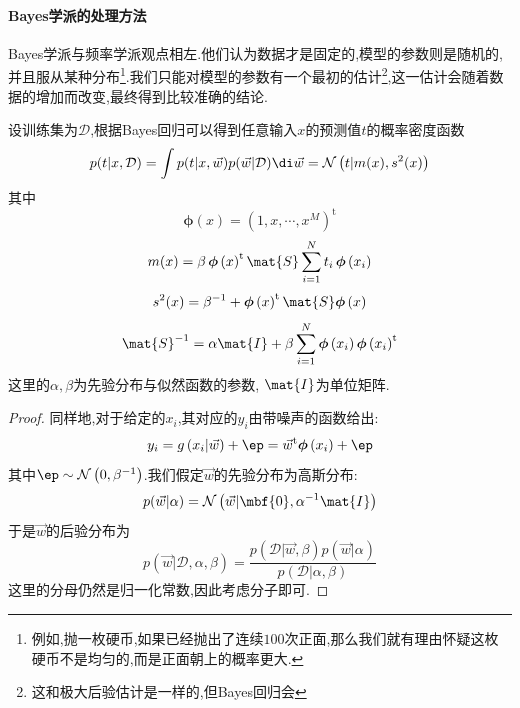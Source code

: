 \documentclass{ctexart}
\begin{document}
\paragraph{Bayes学派的处理方法}
Bayes学派与频率学派观点相左.他们认为数据才是固定的,模型的参数则是随机的,并且服从某种分布\footnote{例如,抛一枚硬币,如果已经抛出了连续$100$次正面,那么我们就有理由怀疑这枚硬币不是均匀的,而是正面朝上的概率更大.}.我们只能对模型的参数有一个最初的估计\footnote{这和极大后验估计是一样的,但Bayes回归会},这一估计会随着数据的增加而改变,最终得到比较准确的结论.
\begin{theorem}[Bayes回归]
    设训练集为$\mathcal{D}$,根据Bayes回归可以得到任意输入$x$的预测值$t$的概率密度函数
    \[p(t|x,\mathcal{D})=\int p(t|x,\vec{w})p(\vec{w}|\mathcal{D})\di\vec{w}=\mathcal{N}\left(t|m(x),s^2(x)\right)\]
    其中
    \[\boldsymbol{\phi}\left(x\right)=\left(1,x,\cdots,x^M\right)^{\mathrm{t}}\]
    \[m(x)=\beta\,\boldsymbol{\phi}\left(x\right)^{\mathrm{t}}\mat{S}\sum_{i=1}^{N}t_i\,\boldsymbol{\phi}\left(x_i\right)\]
    \[s^2(x)=\beta^{-1}+\boldsymbol{\phi}\left(x\right)^{\mathrm{t}}\mat{S}\boldsymbol{\phi}\left(x\right)\]
    \[\mat{S}^{-1}=\alpha\mat{I}+\beta\sum_{i=1}^{N}\boldsymbol{\phi}\left(x_i\right)\boldsymbol{\phi}\left(x_i\right)^{\mathrm{t}}\]
    这里的$\alpha,\beta$为先验分布与似然函数的参数, $\mat{I}$为单位矩阵.
\end{theorem}
\begin{proof}
    同样地,对于给定的$x_i$,其对应的$y_i$由带噪声的函数给出:
    \[y_i=g\left(x_i|\vec{w}\right)+\ep=\vec{w}^{\text{t}}\boldsymbol{\phi}\left(x_i\right)+\ep\]
    其中$\ep\sim\mathcal{N}\left(0,\beta^{-1}\right)$.我们假定$\vec{w}$的先验分布为高斯分布:
    \[p(\vec{w}|\alpha)=\mathcal{N}\left(\vec{w}|\mbf{0},\alpha^{-1}\mat{I}\right)\]
    于是$\vec{w}$的后验分布为
    \[p(\vec{w}|\mathcal{D},\alpha,\beta)=\dfrac{p(\mathcal{D}|\vec{w},\beta)p(\vec{w}|\alpha)}{p(\mathcal{D}|\alpha,\beta)}\]
    这里的分母仍然是归一化常数,因此考虑分子即可.
\end{proof}
\end{document}
